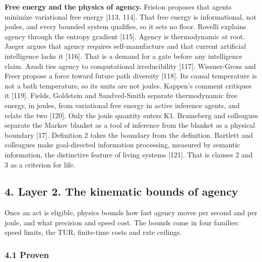\documentclass[
  10pt,
]{article}
\begin{document}
\textbf{Free energy and the physics of agency.} Friston proposes that
agents minimize variational free energy {[}113, 114{]}. That free energy
is informational, not joules, and every bounded system qualifies, so it
sets no floor. Rovelli explains agency through the entropy gradient
{[}115{]}. Agency is thermodynamic at root. Jaeger argues that agency
requires self-manufacture and that current artificial intelligence lacks
it {[}116{]}. That is a demand for a gate before any intelligence claim.
Azadi ties agency to computational irreducibility {[}117{]}.
Wissner-Gross and Freer propose a force toward future path diversity
{[}118{]}. Its causal temperature is not a bath temperature, so its
units are not joules. Kappen's comment critiques it {[}119{]}. Fields,
Goldstein and Sandved-Smith separate thermodynamic free energy, in
joules, from variational free energy in active inference agents, and
relate the two {[}120{]}. Only the joule quantity enters K1. Bruineberg
and colleagues separate the Markov blanket as a tool of inference from
the blanket as a physical boundary {[}17{]}. Definition 2 takes the
boundary from the definition. Bartlett and colleagues make goal-directed
information processing, measured by semantic information, the
distinctive feature of living systems {[}121{]}. That is clauses 2 and 3
as a criterion for life.

\subsection{4. Layer 2. The kinematic bounds of
agency}\label{layer-2.-the-kinematic-bounds-of-agency}

Once an act is eligible, physics bounds how fast agency moves per second
and per joule, and what precision and speed cost. The bounds come in
four families: speed limits, the TUR, finite-time costs and rate
ceilings.

\subsubsection{4.1 Proven}\label{proven-1}
\end{document}
